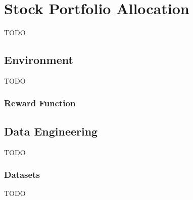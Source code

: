 \documentclass[../xlapes02]{subfiles}
\begin{document}
    \chapter{Stock Portfolio Allocation}\label{sec:implementation}
    TODO


    \section{Environment}\label{sec:environment}
    TODO

    \subsection{Reward Function}\label{subsec:reward-function}


    \section{Data Engineering}\label{ch:data-engineering}
    TODO

    \subsection{Datasets}\label{sec:datasets}
    TODO


\end{document}
